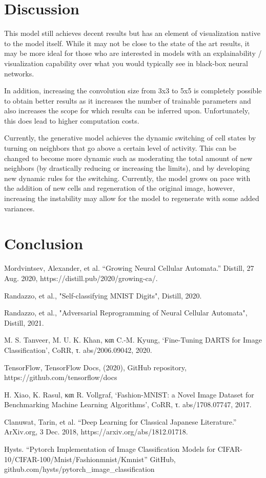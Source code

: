 \documentclass[conference]{IEEEtran}
\begin{document}
\section{Discussion}

This model still achieves decent results but has an element of visualization native to the model itself. While it may not be close to the state of the art results, it may be more ideal for those who are interested in models with an explainability / visualization capability over what you would typically see in black-box neural networks. 

In addition, increasing the convolution size from 3x3 to 5x5 is completely possible to obtain better results as it increases the number of trainable parameters and also increases the scope for which results can be inferred upon. Unfortunately, this does lead to higher computation costs.

Currently, the generative model achieves the dynamic switching of cell states by turning on neighbors that go above a certain level of activity. This can be changed to become more dynamic such as moderating the total amount of new neighbors (by drastically reducing or increasing the limits), and by developing new dynamic rules for the switching. Currently, the model grows on pace with the addition of new cells and regeneration of the original image, however, increasing the instability may allow for the model to regenerate with some added variances.

\section{Conclusion}


\begin{thebibliography}{00}

 Mordvintsev, Alexander, et al. “Growing Neural Cellular Automata.” Distill, 27 Aug. 2020, https://distill.pub/2020/growing-ca/. 

 Randazzo, et al., "Self-classifying MNIST Digits", Distill, 2020.

 Randazzo, et al., "Adversarial Reprogramming of Neural Cellular Automata", Distill, 2021.

 M. S. Tanveer, M. U. K. Khan, και C.-M. Kyung, ‘Fine-Tuning DARTS for Image Classification’, CoRR, τ. abs/2006.09042, 2020.

 TensorFlow, TensorFlow Docs, (2020), GitHub repository, https://github.com/tensorflow/docs

 H. Xiao, K. Rasul, και R. Vollgraf, ‘Fashion-MNIST: a Novel Image Dataset for Benchmarking Machine Learning Algorithms’, CoRR, τ. abs/1708.07747, 2017.

 Clanuwat, Tarin, et al. “Deep Learning for Classical Japanese Literature.” ArXiv.org, 3 Dec. 2018, https://arxiv.org/abs/1812.01718. 

  Hysts. “Pytorch Implementation of Image Classification Models for CIFAR-10/CIFAR-100/Mnist/Fashionmnist/Kmnist” GitHub, github.com/hysts/pytorch\_image\_classification

\end{thebibliography}
\end{document}
